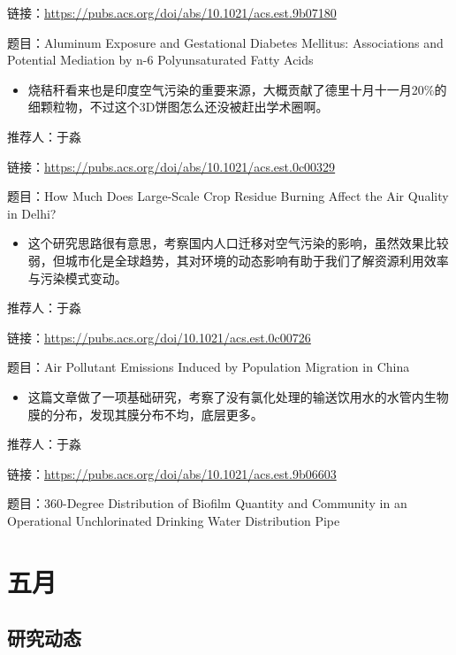 \documentclass[]{book}
\providecommand{\tightlist}{%
  \setlength{\itemsep}{0pt}\setlength{\parskip}{0pt}}
\begin{document}
链接：\url{https://pubs.acs.org/doi/abs/10.1021/acs.est.9b07180}

题目：Aluminum Exposure and Gestational Diabetes Mellitus: Associations and Potential Mediation by n-6 Polyunsaturated Fatty Acids

\begin{itemize}
\tightlist
\item
  烧秸秆看来也是印度空气污染的重要来源，大概贡献了德里十月十一月20\%的细颗粒物，不过这个3D饼图怎么还没被赶出学术圈啊。
\end{itemize}

推荐人：于淼

链接：\url{https://pubs.acs.org/doi/abs/10.1021/acs.est.0c00329}

题目：How Much Does Large-Scale Crop Residue Burning Affect the Air Quality in Delhi?

\begin{itemize}
\tightlist
\item
  这个研究思路很有意思，考察国内人口迁移对空气污染的影响，虽然效果比较弱，但城市化是全球趋势，其对环境的动态影响有助于我们了解资源利用效率与污染模式变动。
\end{itemize}

推荐人：于淼

链接：\url{https://pubs.acs.org/doi/10.1021/acs.est.0c00726}

题目：Air Pollutant Emissions Induced by Population Migration in China

\begin{itemize}
\tightlist
\item
  这篇文章做了一项基础研究，考察了没有氯化处理的输送饮用水的水管内生物膜的分布，发现其膜分布不均，底层更多。
\end{itemize}

推荐人：于淼

链接：\url{https://pubs.acs.org/doi/abs/10.1021/acs.est.9b06603}

题目：360-Degree Distribution of Biofilm Quantity and Community in an Operational Unchlorinated Drinking Water Distribution Pipe

\hypertarget{ux4e94ux6708-2}{%
\section*{五月}\label{ux4e94ux6708-2}}

\hypertarget{ux7814ux7a76ux52a8ux6001-30}{%
\subsection*{研究动态}\label{ux7814ux7a76ux52a8ux6001-30}}
\end{document}
